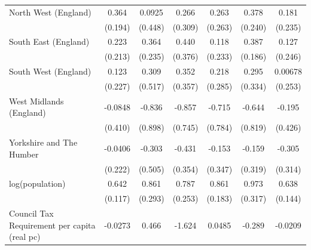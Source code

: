 \begin{table}[htbp]
\begin{tabular}{l*{6}{c}}
\addlinespace
North West (England)&       0.364\sym{*}  &      0.0925         &       0.266         &       0.263         &       0.378         &       0.181         \\
                    &     (0.194)         &     (0.448)         &     (0.309)         &     (0.263)         &     (0.240)         &     (0.235)         \\
\addlinespace
South East (England)&       0.223         &       0.364         &       0.440         &       0.118         &       0.387\sym{**} &       0.127         \\
                    &     (0.213)         &     (0.235)         &     (0.376)         &     (0.233)         &     (0.186)         &     (0.246)         \\
\addlinespace
South West (England)&       0.123         &       0.309         &       0.352         &       0.218         &       0.295         &     0.00678         \\
                    &     (0.227)         &     (0.517)         &     (0.357)         &     (0.285)         &     (0.334)         &     (0.253)         \\
\addlinespace
West Midlands (England)&     -0.0848         &      -0.836         &      -0.857         &      -0.715         &      -0.644         &      -0.195         \\
                    &     (0.410)         &     (0.898)         &     (0.745)         &     (0.784)         &     (0.819)         &     (0.426)         \\
\addlinespace
Yorkshire and The Humber&     -0.0406         &      -0.303         &      -0.431         &      -0.153         &      -0.159         &      -0.305         \\
                    &     (0.222)         &     (0.505)         &     (0.354)         &     (0.347)         &     (0.319)         &     (0.314)         \\
\addlinespace
log(population)     &       0.642\sym{***}&       0.861\sym{***}&       0.787\sym{***}&       0.861\sym{***}&       0.973\sym{***}&       0.638\sym{***}\\
                    &     (0.117)         &     (0.293)         &     (0.253)         &     (0.183)         &     (0.317)         &     (0.144)         \\
\addlinespace
Council Tax Requirement per capita (real pc)&     -0.0273         &       0.466         &      -1.624         &      0.0485         &      -0.289         &     -0.0209         \\

\end{tabular}
\end{table}
